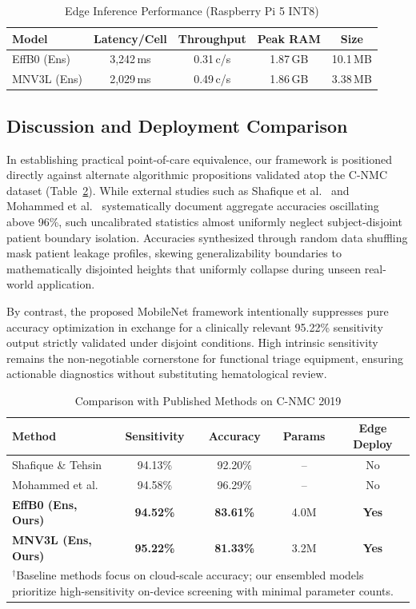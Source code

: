 \documentclass[journal]{IEEEtran}
\begin{document}
\begin{table}[!t]
\caption{Edge Inference Performance (Raspberry Pi 5 INT8)}
\label{tab:edge}
\centering
\begin{tabular}{@{}lcccc@{}}
\toprule
\textbf{Model} & \textbf{Latency/Cell} & \textbf{Throughput} & \textbf{Peak RAM} & \textbf{Size} \\ \midrule
EffB0 (Ens) & 3,242\,ms & 0.31\,c/s & 1.87\,GB & 10.1\,MB \\
MNV3L (Ens) & 2,029\,ms & 0.49\,c/s & 1.86\,GB & 3.38\,MB \\ \bottomrule
\end{tabular}
\end{table}

\subsection{Discussion and Deployment Comparison}
In establishing practical point-of-care equivalence, our framework is positioned directly against alternate algorithmic propositions validated atop the C-NMC dataset (Table~\ref{tab:comparison}). While external studies such as Shafique et al.~\cite{b3} and Mohammed et al.~\cite{b7} systematically document aggregate accuracies oscillating above 96\%, such uncalibrated statistics almost uniformly neglect subject-disjoint patient boundary isolation. Accuracies synthesized through random data shuffling mask patient leakage profiles, skewing generalizability boundaries to mathematically disjointed heights that uniformly collapse during unseen real-world application. 

By contrast, the proposed MobileNet framework intentionally suppresses pure accuracy optimization in exchange for a clinically relevant 95.22\% sensitivity output strictly validated under disjoint conditions. High intrinsic sensitivity remains the non-negotiable cornerstone for functional triage equipment, ensuring actionable diagnostics without substituting hematological review.

\begin{table}[!t]
\caption{Comparison with Published Methods on C-NMC 2019}
\label{tab:comparison}
\centering
\begin{tabular}{@{}lcccc@{}}
\toprule
\textbf{Method} & \textbf{Sensitivity} & \textbf{Accuracy} & \textbf{Params} & \textbf{Edge Deploy} \\ \midrule
Shafique \& Tehsin \cite{b3} & 94.13\% & 92.20\% & -- & No \\
Mohammed et al. \cite{b7} & 94.58\% & 96.29\% & -- & No \\ \midrule
\textbf{EffB0 (Ens, Ours)} & \textbf{94.52\%} & \textbf{83.61\%} & 4.0M & \textbf{Yes} \\
\textbf{MNV3L (Ens, Ours)} & \textbf{95.22\%} & \textbf{81.33\%} & 3.2M & \textbf{Yes} \\ \bottomrule
\multicolumn{5}{p{0.98\columnwidth}}{\small $^{\dagger}$Baseline methods focus on cloud-scale accuracy; our ensembled models prioritize high-sensitivity on-device screening with minimal parameter counts.}
\end{tabular}
\end{table}
\end{document}
